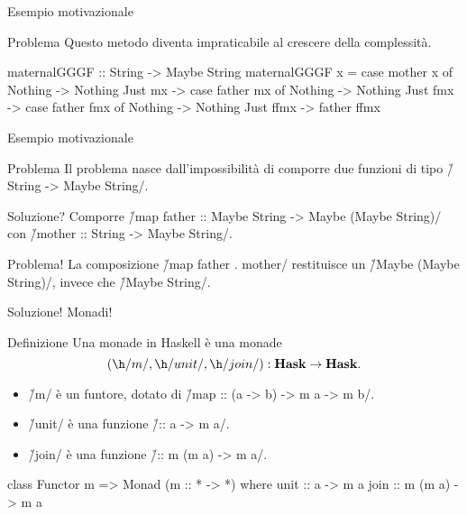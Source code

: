 \begin{frame}[fragile]{\secname}{Esempio motivazionale}
\begin{block}{Problema}
Questo metodo diventa impraticabile al crescere della complessità.
\pause

\begin{haskellcode}
maternalGGGF :: String -> Maybe String
maternalGGGF x = case mother x of
    Nothing -> Nothing
    Just mx -> case father mx of
        Nothing  -> Nothing
        Just fmx -> case father fmx of
            Nothing   -> Nothing
            Just ffmx -> father ffmx
\end{haskellcode}
\end{block}
\end{frame}

\begin{frame}[fragile]{\secname}{Esempio motivazionale}
\begin{block}{Problema}
Il problema nasce dall'impossibilità di comporre due funzioni di tipo \h/String -> Maybe String/.
\end{block}
\pause
\begin{block}{Soluzione?}
Comporre \h/map father :: Maybe String -> Maybe (Maybe String)/ con \h/mother :: String -> Maybe String/.
\end{block}
\pause
\begin{block}{Problema!}
La composizione \h/map father . mother/ restituisce un \h/Maybe (Maybe String)/, invece che \h/Maybe String/.
\end{block}
\pause
\begin{block}{Soluzione!}
Monadi!
\end{block}
\end{frame}

\begin{frame}[fragile]{\secname}{Definizione}
Una monade in Haskell è una monade
\[
(\h/m/,\h/unit/,\h/join/):\Hask{}\to\Hask{}.
\]
\vspace{-0.5cm}
\begin{itemize}[<+(1)->]
\item \h/m/ è un funtore, dotato di \h/map :: (a -> b) -> m a -> m b/.
\item \h/unit/ è una funzione \h/:: a -> m a/.
\item \h/join/ è una funzione \h/:: m (m a) -> m a/.
\end{itemize}
\pause

\begin{haskellcode}
class Functor m => Monad (m :: * -> *) where
    unit :: a -> m a
    join :: m (m a) -> m a
\end{haskellcode}
\end{frame}

